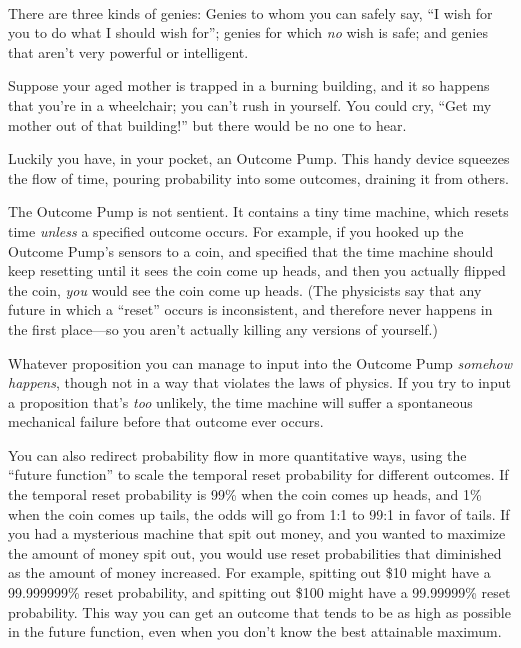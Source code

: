 \bigskip

{
 ~}

{
 There are three kinds of genies: Genies to whom you can safely
say, ``I wish for you to do what I should wish
for''; genies for which \textit{no} wish is safe; and
genies that aren't very powerful or intelligent.}

{
 Suppose your aged mother is trapped in a burning building, and it
so happens that you're in a wheelchair; you
can't rush in yourself. You could cry,
``Get my mother out of that
building!'' but there would be no one to hear.}

{
 Luckily you have, in your pocket, an Outcome Pump. This handy
device squeezes the flow of time, pouring probability into some
outcomes, draining it from others.}

{
 The Outcome Pump is not sentient. It contains a tiny time machine,
which resets time \textit{unless} a specified outcome occurs. For
example, if you hooked up the Outcome Pump's sensors to
a coin, and specified that the time machine should keep resetting until
it sees the coin come up heads, and then you actually flipped the coin,
\textit{you} would see the coin come up heads. (The physicists say that
any future in which a ``reset''
occurs is inconsistent, and therefore never happens in the first
place---so you aren't actually killing any versions of
yourself.)}

{
 Whatever proposition you can manage to input into the Outcome Pump
\textit{somehow happens}, though not in a way that violates the laws of
physics. If you try to input a proposition that's
\textit{too} unlikely, the time machine will suffer a spontaneous
mechanical failure before that outcome ever occurs.}

{
 You can also redirect probability flow in more quantitative ways,
using the ``future function'' to
scale the temporal reset probability for different outcomes. If the
temporal reset probability is 99\% when the coin comes up heads, and
1\% when the coin comes up tails, the odds will go from 1:1 to 99:1 in
favor of tails. If you had a mysterious machine that spit out money,
and you wanted to maximize the amount of money spit out, you would use
reset probabilities that diminished as the amount of money increased.
For example, spitting out \$10 might have a 99.999999\% reset
probability, and spitting out \$100 might have a 99.99999\% reset
probability. This way you can get an outcome that tends to be as high
as possible in the future function, even when you don't
know the best attainable maximum.}

